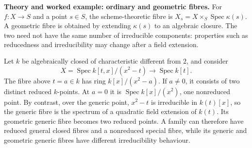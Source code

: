 \noindent\textbf{Theory and worked example: ordinary and geometric fibres.}
For $f:X\to S$ and a point $s\in S$, the scheme-theoretic fibre is
$X_s=X\times_S\operatorname{Spec}\kappa(s)$. A geometric fibre is
obtained by extending $\kappa(s)$ to an algebraic closure. The two
need not have the same number of irreducible components: properties
such as reducedness and irreducibility may change after a field
extension.

Let $k$ be algebraically closed of characteristic different from $2$,
and consider
\[
X=\operatorname{Spec}k[t,x]/(x^2-t)
\longrightarrow \operatorname{Spec}k[t].
\]
The fibre above $t=a\in k$ has ring $k[x]/(x^2-a)$. If $a\ne0$,
it consists of two distinct reduced $k$-points. At $a=0$ it is
$\operatorname{Spec}k[x]/(x^2)$, one nonreduced point. By contrast,
over the generic point, $x^2-t$ is irreducible in $k(t)[x]$, so the
generic fibre is the spectrum of a quadratic field extension of
$k(t)$. Its geometric generic fibre becomes two reduced points.
A family can therefore have reduced general closed fibres and a
nonreduced special fibre, while its generic and geometric generic
fibres have different irreducibility behaviour.

\medskip
